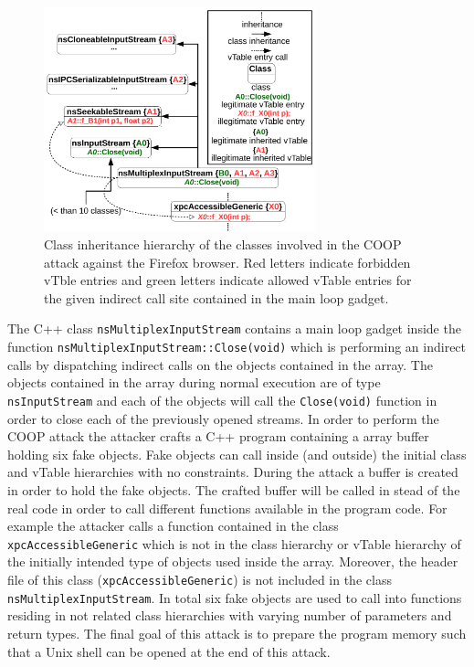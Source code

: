 \begin{figure}[h]
    \centering
    \includegraphics[width=0.7\textwidth]{figures/class_hierarchy.pdf}
\caption{Class inheritance hierarchy of the classes involved in the COOP attack against the Firefox browser. Red letters 
indicate forbidden vTble entries and green letters indicate allowed vTable entries for the given indirect call site
contained in the main loop gadget.}
\label{Class exploit}
\end{figure}

The C++ class \texttt{nsMultiplexInputStream} contains a main loop gadget inside the function 
\texttt{nsMultiplexInputStream::Close(void)} which is performing an indirect calls by dispatching
indirect calls on the objects contained in the array. 
The objects contained in the array during normal execution are of type \texttt{nsInputStream} and each
of the objects will call the \texttt{Close(void)} function in order to close each of the previously opened streams.
In order to perform the COOP attack the attacker crafts a C++ program containing a array buffer holding 
six fake objects. Fake objects can call inside (and outside) the initial class and vTable hierarchies
with no constraints.
During the attack a buffer is created in order to hold the fake objects.
The crafted buffer will be called in stead of the real code in order to call different functions
available in the program code. For example the attacker calls a function contained in the class
\texttt{xpcAccessibleGeneric} which is not in the class hierarchy or vTable hierarchy
of the initially intended type of objects used inside the array.
Moreover, the header file of this class (\texttt{xpcAccessibleGeneric}) is not included in the 
class \texttt{nsMultiplexInputStream}.
In total six fake objects are used to call into functions residing in not related class hierarchies with varying 
number of parameters and return types. The final goal of this attack is to prepare the program memory such 
that a Unix shell can be opened at the end of this attack.

